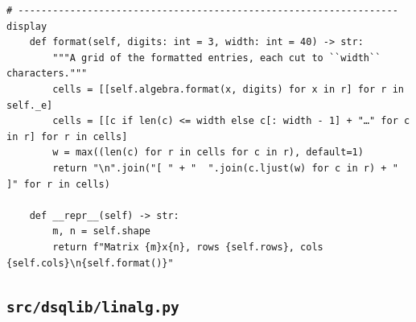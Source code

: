 \documentclass[12pt, a4paper]{report}
\theoremstyle{plain}
\theoremstyle{definition}
\theoremstyle{remark}
\theoremstyle{plain}
\begin{document}
\begin{lstlisting}[style=dsqcode]
    # ------------------------------------------------------------------ display
    def format(self, digits: int = 3, width: int = 40) -> str:
        """A grid of the formatted entries, each cut to ``width`` characters."""
        cells = [[self.algebra.format(x, digits) for x in r] for r in self._e]
        cells = [[c if len(c) <= width else c[: width - 1] + "…" for c in r] for r in cells]
        w = max((len(c) for r in cells for c in r), default=1)
        return "\n".join("[ " + "  ".join(c.ljust(w) for c in r) + " ]" for r in cells)

    def __repr__(self) -> str:
        m, n = self.shape
        return f"Matrix {m}x{n}, rows {self.rows}, cols {self.cols}\n{self.format()}"
\end{lstlisting}
\subsection{\texorpdfstring{\texttt{src/dsqlib/linalg.py}}{src/dsqlib/linalg.py}}
\end{document}
